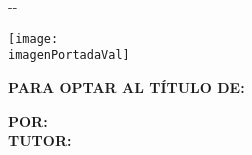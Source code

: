 {\begin{cambiamargen}{-\cambioIzquierdo}{-\cambioDerecho}
      \vfill

      \begin{center}
        \vfill
        \texttt{[image: \\imagenPortadaVal]}
        \\[5mm]
      \end{center}

      \begin{Huge}
        \begin{center}
          {\textbf{\tipoDocumentoVal}}
        \end{center}
      \end{Huge}

      \vfill

    \begin{large}
      \begin{center}
        \textbf{\tituloPortadaVal}
        \end{center}
    \end{large}

      \vfill

    \begin{large}
      \begin{center}
        \textbf{PARA OPTAR AL TÍTULO DE: \tituloAOptarVal}\\[4mm]
      \end{center}
    \end{large}

    \begin{normalsize}
      \begin{center}
        \textbf{POR: \autorPortadaVal}\\[0.3cm]
        \textbf{TUTOR: \nombreAsesorVal}\\[0.3cm]
      \end{center}
    \end{normalsize}
  
    \begin{normalsize}
      \begin{center}
        \textbf{\lugarPublicacionVal}\\
        \textbf{\fechaPublicacionVal}
      \end{center}
    \end{normalsize}
    
  \end{cambiamargen}

  \newpage

}
